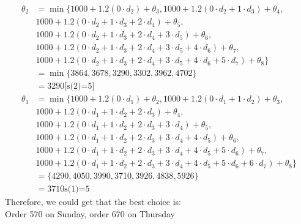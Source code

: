 \documentclass[a4paper,12pt]{journal}
\begin{document}
\begin{equation}
\begin{aligned}
			\theta_2&=\min\{1000+1.2(0\cdot d_2)+\theta_3,1000+1.2(0\cdot d_2+1\cdot d_3)+\theta_4,\\
			&1000+1.2(0\cdot d_2+1\cdot d_3+2\cdot d_4)+\theta_5,\\
			& 1000+1.2(0\cdot d_2+1\cdot d_3+2\cdot d_4+3
			\cdot d_5)+\theta_6,\\
			&1000+1.2(0\cdot d_2+1\cdot d_3+2\cdot d_4+3
			\cdot d_5+4\cdot d_6)+\theta_7,\\
			&1000+1.2(0\cdot d_2+1\cdot d_3+2\cdot d_4+3
			\cdot d_5+4\cdot d_6+5\cdot d_7)+\theta_8\}\\
			&=\min\{3864,3678,3290,3302,3962,4702\}\\
			&=3290\text{[s(2)=5]}\\
			\theta_1&=\min\{1000+1.2(0\cdot d_1)+\theta_2,1000+1.2(0\cdot d_1+1\cdot d_2)+\theta_3,\\
			&1000+1.2(0\cdot d_1+1\cdot d_2+2\cdot d_3)+\theta_4,\\
			& 1000+1.2(0\cdot d_1+1\cdot d_2+2\cdot d_3+3
			\cdot d_4)+\theta_5,\\
			&1000+1.2(0\cdot d_1+1\cdot d_2+2\cdot d_3+3
			\cdot d_4+4\cdot d_5)+\theta_6,\\
			&1000+1.2(0\cdot d_1+1\cdot d_2+2\cdot d_3+3
			\cdot d_4+4\cdot d_5+5\cdot d_6)+\theta_7,\\
			&1000+1.2(0\cdot d_1+1\cdot d_2+2\cdot d_3+3
			\cdot d_4+4\cdot d_5+5\cdot d_6+6\cdot d_7)+\theta_8\}\\
			&=\{4290,4050,3990,3710,3926,4838,5926\}\\
			&=3710\text{s(1)=5}
		\end{aligned}
	\end{equation}
Therefore, we could get that the best choice is:\\
Order 570 on Sunday, order 670 on Thursday
\end{document}
